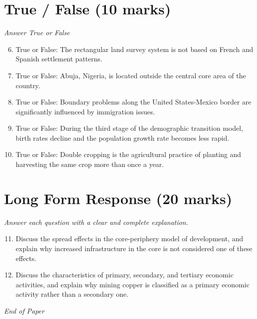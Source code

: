\documentclass[12pt]{article}
\begin{document}
\section*{True / False (10 marks)}
\textit{Answer True or False}
\begin{enumerate}[label=\arabic*.]
\setcounter{enumi}{5}
\item True or False: The rectangular land survey system is not based on French and Spanish settlement patterns.
\item True or False: Abuja, Nigeria, is located outside the central core area of the country.
\item True or False: Boundary problems along the United States-Mexico border are significantly influenced by immigration issues.
\item True or False: During the third stage of the demographic transition model, birth rates decline and the population growth rate becomes less rapid.
\item True or False: Double cropping is the agricultural practice of planting and harvesting the same crop more than once a year.
\end{enumerate}

\section*{Long Form Response (20 marks)}
\textit{Answer each question with a clear and complete explanation.}
\begin{enumerate}[label=\arabic*.]
\setcounter{enumi}{10}
\item Discuss the spread effects in the core-periphery model of development, and explain why increased infrastructure in the core is not considered one of these effects.
\item Discuss the characteristics of primary, secondary, and tertiary economic activities, and explain why mining copper is classified as a primary economic activity rather than a secondary one.
\end{enumerate}

\vfill
\noindent\textit{End of Paper}
\end{document}
